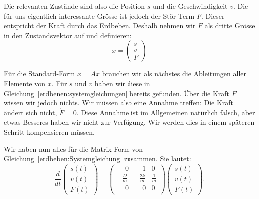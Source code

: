Die relevanten Zustände sind also die Position $s$ und die Geschwindigkeit $v$.
Die für uns eigentlich interessante Grösse ist jedoch der Stör-Term $F$.
Dieser entspricht der Kraft durch das Erdbeben.
Deshalb nehmen wir $F$ als dritte Grösse in den Zustandsvektor auf und definieren:
\[ 
  x = \begin{pmatrix} s \\ v \\ F \end{pmatrix}
\] 
  
Für die Standard-Form $\dot x = Ax$ brauchen wir als nächstes die Ableitungen aller Elemente von $x$.
Für $s$ und $v$  haben wir diese in Gleichung~\eqref{erdbenen:systemgleichungen} bereits gefunden.
Über die Kraft $F$ wissen wir jedoch nichts.
Wir müssen also eine Annahme treffen: Die Kraft ändert sich nicht, $\dot F = 0$.
Diese Annahme ist im Allgemeinen natürlich falsch, aber etwas Besseres haben wir nicht zur Verfügung.
Wir werden dies in einem späteren Schritt kompensieren müssen.

Wir haben nun alles für die Matrix-Form von Gleichung~\eqref{erdbeben:Systemgleichung} zusammen.
Sie lautet:
\begin{equation}
  \frac{d}{dt} \begin{pmatrix} s(t) \\ v(t) \\ F(t) \end{pmatrix}
  =
 \begin{pmatrix}
  \phantom- 0 & \phantom-1& 0 \\ 
  - \frac{D}{m} &-\frac{2k}{m} & \frac{1} {m} \\
  \phantom-0 & \phantom-0 & 0\\
  \end{pmatrix}
  \begin{pmatrix} s(t) \\ v(t) \\ F(t) \end{pmatrix}.
  \label{erdbeben:systemmatrix}
\end{equation}

